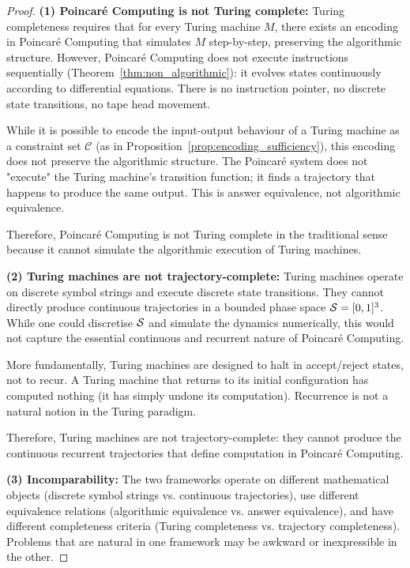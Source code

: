 \begin{proof}
\textbf{(1) Poincaré Computing is not Turing complete:} Turing completeness requires that for every Turing machine $M$, there exists an encoding in Poincaré Computing that simulates $M$ step-by-step, preserving the algorithmic structure. However, Poincaré Computing does not execute instructions sequentially (Theorem~\ref{thm:non_algorithmic}): it evolves states continuously according to differential equations. There is no instruction pointer, no discrete state transitions, no tape head movement.

While it is possible to encode the input-output behaviour of a Turing machine as a constraint set $\mathcal{C}$ (as in Proposition~\ref{prop:encoding_sufficiency}), this encoding does not preserve the algorithmic structure. The Poincaré system does not "execute" the Turing machine's transition function; it finds a trajectory that happens to produce the same output. This is answer equivalence, not algorithmic equivalence.

Therefore, Poincaré Computing is not Turing complete in the traditional sense because it cannot simulate the algorithmic execution of Turing machines.

\textbf{(2) Turing machines are not trajectory-complete:} Turing machines operate on discrete symbol strings and execute discrete state transitions. They cannot directly produce continuous trajectories in a bounded phase space $\mathcal{S} = [0,1]^3$. While one could discretise $\mathcal{S}$ and simulate the dynamics numerically, this would not capture the essential continuous and recurrent nature of Poincaré Computing.

More fundamentally, Turing machines are designed to halt in accept/reject states, not to recur. A Turing machine that returns to its initial configuration has computed nothing (it has simply undone its computation). Recurrence is not a natural notion in the Turing paradigm.

Therefore, Turing machines are not trajectory-complete: they cannot produce the continuous recurrent trajectories that define computation in Poincaré Computing.

\textbf{(3) Incomparability:} The two frameworks operate on different mathematical objects (discrete symbol strings vs. continuous trajectories), use different equivalence relations (algorithmic equivalence vs. answer equivalence), and have different completeness criteria (Turing completeness vs. trajectory completeness). Problems that are natural in one framework may be awkward or inexpressible in the other.


\end{proof}
